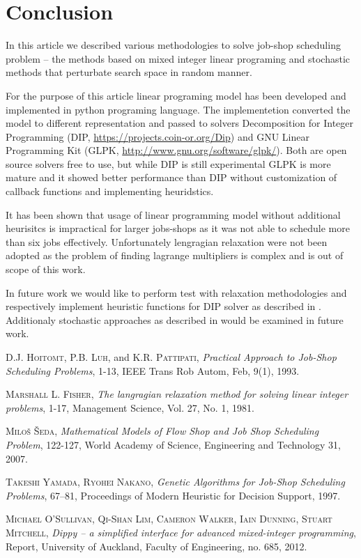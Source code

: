 \documentclass[a4paper,journal,twocolumn]{IEEEtran}
\begin{document}
\section{Conclusion}
In this article we described various methodologies to solve job-shop scheduling problem --
the methods based on mixed integer linear programing and stochastic methods that perturbate search space in random manner. 

For the purpose of this article linear programing model has been developed and implemented in python programing language. The implementetion converted the model
to different representation and passed to solvers Decomposition for Integer Programming (DIP, \url{https://projects.coin-or.org/Dip})
and GNU Linear Programming Kit (GLPK, \url{http://www.gnu.org/software/glpk/}). Both are open source solvers free to use, but while DIP is still experimental GLPK 
is more mature and it showed better performance than DIP without customization of callback functions and implementing heuridstics.

It has been shown that usage of
linear programming model without additional heurisitcs is impractical for larger jobs-shops as it was not able to schedule more than six jobs effectively. 
Unfortunately lengragian relaxation were not been adopted as the problem of finding lagrange multipliers is complex and is out of scope of this work.

In future work we would like to perform test with relaxation methodologies and respectively implement heuristic functions for DIP solver as described in \cite{Dip}.
Additionaly stochastic approaches as described in \cite{Uni} would be examined in future work.


\begin{thebibliography}{1}

 \textsc{D.J. Hoitomt}, \textsc{P.B. Luh}, and \textsc{K.R. Pattipati}, \emph{Practical Approach to Job-Shop Scheduling
Problems}, 1-13, IEEE Trans Rob Autom, Feb, 9(1), 1993.

 \textsc{Marshall L. Fisher}, \emph{The langragian relaxation method for solving linear integer problems}, 1-17, 
Management Science, Vol. 27, No. 1, 1981.

 \textsc{Miloš Šeda}, \emph{Mathematical Models of Flow Shop and Job Shop Scheduling Problem}, 122-127, World Academy of Science, Engineering and Technology 31, 2007.

 \textsc{Takeshi Yamada, Ryohei Nakano}, \emph{Genetic Algorithms for Job-Shop  Scheduling Problems}, 67–81, Proceedings of Modern Heuristic for Decision Support, 1997.

 \textsc{Michael O’Sullivan, Qi-Shan Lim, Cameron Walker, Iain Dunning, Stuart Mitchell}, \emph{Dippy – a simplified interface for advanced mixed-integer programming}, Report, University of Auckland, Faculty of Engineering, no. 685, 2012.


\end{thebibliography}


\end{document}
